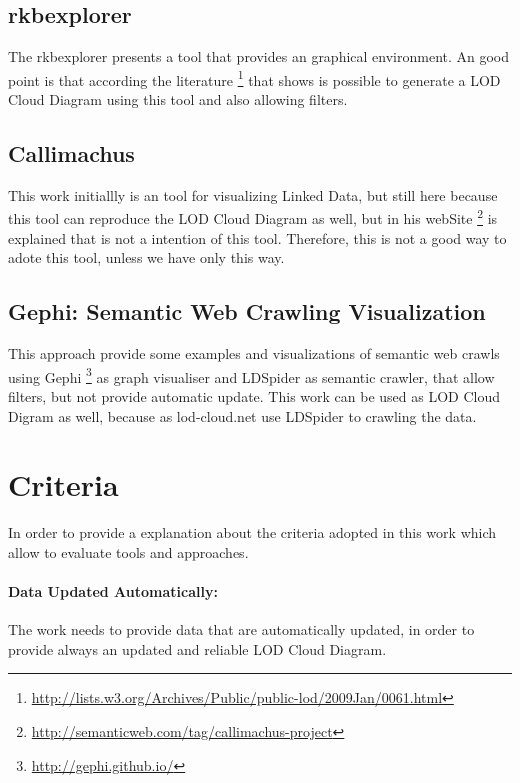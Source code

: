 \subsection{rkbexplorer} 
The rkbexplorer \cite{rbkexplorer} presents a tool that provides an graphical environment. An good point is that according the literature \footnote{\url{http://lists.w3.org/Archives/Public/public-lod/2009Jan/0061.html}} that shows is  possible to generate a LOD Cloud Diagram using this tool and also allowing filters.

\subsection{Callimachus}
This work initiallly \cite{callimachus} is an tool for visualizing Linked Data, but still here because this tool can reproduce the LOD Cloud Diagram as well, but in his webSite \footnote{ \url{http://semanticweb.com/tag/callimachus-project}} is explained that is not a intention of this tool. Therefore, this is not a good way to adote this tool, unless we have only this way.

\subsection{Gephi: Semantic Web Crawling Visualization}
This approach \cite{WebCrawlVis} provide some examples and visualizations of semantic web crawls using Gephi \footnote{\url{http://gephi.github.io/}} as graph visualiser and LDSpider as semantic crawler, that allow filters, but not provide automatic update.
This work can be used as LOD Cloud Digram as well, because as lod-cloud.net use LDSpider to crawling the data.


\section{Criteria}
In order to provide a explanation about the criteria adopted in this work which allow to evaluate tools and approaches.

\paragraph{Data Updated Automatically:} The work needs to provide data that are automatically updated, in order to provide always an updated and reliable LOD Cloud Diagram.


